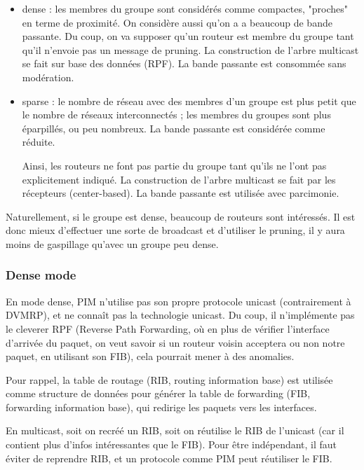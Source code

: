 		\begin{itemize}
			\item dense : les membres du groupe sont considérés comme compactes, "proches" en terme de proximité. On considère aussi qu'on a a beaucoup de bande passante.
			Du coup, on va supposer qu'un routeur est membre du groupe tant qu'il n'envoie pas un message de pruning. La construction de l'arbre multicast se fait sur base des données (RPF). La bande passante est consommée sans modération.
			
			
			\item sparse : le nombre de réseau avec des membres d'un groupe est plus petit que le nombre de réseaux interconnectés ; les membres du groupes sont plus éparpillés, ou peu nombreux. La bande passante est considérée comme réduite.
			
			Ainsi, les routeurs ne font pas partie du groupe tant qu'ils ne l'ont pas explicitement indiqué. La construction de l'arbre multicast se fait par les récepteurs (center-based). La bande passante est utilisée avec parcimonie.
		\end{itemize}
		
		Naturellement, si le groupe est dense, beaucoup de routeurs sont intéressés. Il est donc mieux d'effectuer une sorte de broadcast et d'utiliser le pruning, il y aura moins de gaspillage qu'avec un groupe peu dense.
		
		\subsubsection{Dense mode}
		
		En mode dense, PIM n'utilise pas son propre protocole unicast (contrairement à DVMRP), et ne connaît pas la technologie unicast. Du coup, il n'implémente pas le cleverer RPF (Reverse Path Forwarding, où en plus de vérifier l'interface d'arrivée du paquet, on veut savoir si un routeur voisin acceptera ou non notre paquet, en utilisant son FIB), cela pourrait mener à des anomalies.
		
		Pour rappel, la table de routage (RIB, routing information base) est utilisée comme structure de données pour générer la table de forwarding (FIB, forwarding information base), qui redirige les paquets vers les interfaces.
		
		En multicast, soit on recréé un RIB, soit on réutilise le RIB de l'unicast (car il contient plus d'infos intéressantes que le FIB). Pour être indépendant, il faut éviter de reprendre RIB, et un protocole comme PIM peut réutiliser le FIB.
		
